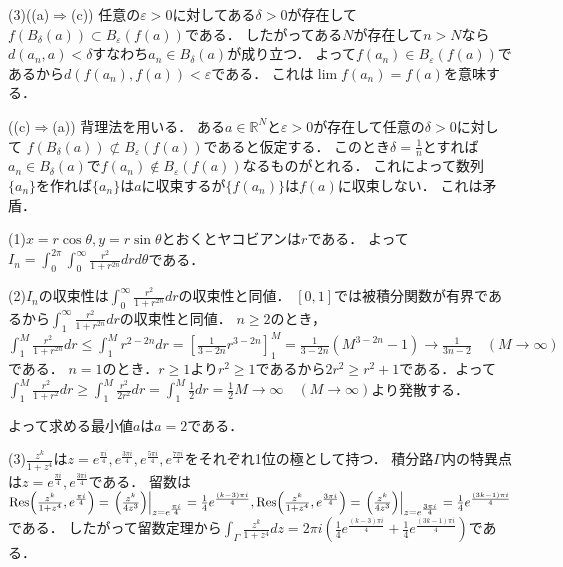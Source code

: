 \documentclass[
		book,
		head_space=20mm,
		foot_space=20mm,
		gutter=10mm,
		line_length=190mm
]{jlreq}
\begin{document}
(3)((a)$\Rightarrow $(c))
任意の$ \varepsilon>0$に対してある$\delta>0$が存在して$f(B_\delta(a))\subset B_\varepsilon(f(a))$である．
したがってある$N$が存在して$n>N$なら$d(a_n,a)<\delta$すなわち$a_n\in B_\delta(a)$が成り立つ．
よって$f(a_n)\in B_\varepsilon(f(a))$であるから$d(f(a_n),f(a))<\varepsilon$である．
これは$\lim f(a_n)=f(a)$を意味する．

((c)$\Rightarrow$(a))
背理法を用いる．
ある$a\in \mathbb{R}^N$と$\varepsilon>0$が存在して任意の$\delta>0$に対して
$f(B_\delta(a))\not\subset B_\varepsilon(f(a))$であると仮定する．
このとき$\delta=\frac{1}{n}$とすれば$a_n\in B_\delta(a)$で$f(a_n)\not\in B_\varepsilon(f(a))$なるものがとれる．
これによって数列$\{a_n\}$を作れば$\{a_n\}$は$a$に収束するが$\{ f(a_n)\}$は$f(a)$に収束しない．
これは矛盾．

(1)$x=r\cos \theta,y=r\sin \theta$とおくとヤコビアンは$r$である．
よって$I_n=\int_0^{2\pi}\int_0^{\infty}\frac{r^2}{1+r^{2n}}drd\theta$である．

(2)$I_n$の収束性は$\int_0^{\infty}\frac{r^2}{1+r^{2n}}dr$の収束性と同値．
$[0,1]$では被積分関数が有界であるから$\int_1^\infty\frac{r^2}{1+r^{2n}}dr$の収束性と同値．
$n\ge 2$のとき，$\int_1^M \frac{r^2}{1+r^{2n}}dr\le \int_1^M r^{2-2n}dr=\left[ \frac{1}{3-2n}r^{3-2n} \right]_1^M =\frac{1}{3-2n}(M^{3-2n}-1)\rightarrow \frac{1}{3n-2}\quad(M\to \infty)$である．
$n=1$のとき．$r\ge 1$より$r^2\ge 1$であるから$2r^2\ge r^2+1$である．よって
$\int_1^M\frac{r^2}{1+r^{2}}dr\ge \int_1^M \frac{r^2}{2r^2}dr=\int_1^M \frac{1}{2}dr= \frac{1}{2}M\rightarrow \infty\quad (M\to \infty)$より発散する．

よって求める最小値$a$は$a=2$である．

(3)$\frac{z^k}{1+z^4}$は$z=e^{\frac{\pi i}{4}},e^{\frac{3\pi i}{4}},e^{\frac{5\pi i}{4}},e^{\frac{7\pi i}{4}}$をそれぞれ1位の極として持つ．
積分路$\Gamma$内の特異点は$z=e^{\frac{\pi i}{4}},e^{\frac{3\pi i}{4}}$である．
留数は$\Res (\frac{z^k}{1+z^4},e^{\frac{\pi i}{4}})=\left. \left( \frac{z^k}{4z^3} \right) \right|_{z=e^{\frac{\pi i}{4}}}=\frac{1}{4}e^{\frac{(k-3)\pi i}{4}},\Res (\frac{z^k}{1+z^4},e^{\frac{3\pi i}{4}})=\left. \left( \frac{z^k}{4z^3} \right) \right|_{z=e^{\frac{3\pi i}{4}}}=\frac{1}{4}e^{\frac{(3k-1)\pi i}{4}}$である．
したがって留数定理から$\int_{\Gamma}\frac{z^k}{1+z^4}dz=2\pi i (\frac{1}{4}e^{\frac{(k-3)\pi i}{4}}+\frac{1}{4}e^{\frac{(3k-1)\pi i}{4}})$である．
\end{document}

